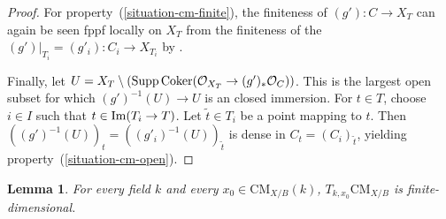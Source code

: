 \documentclass{stacks-project}
\theoremstyle{plain}
\newtheorem{lemma}[subsection]{Lemma}
\theoremstyle{definition}
\theoremstyle{remark}
\numberwithin{equation}{subsection}
\def\Im{\mathop{\rm Im}}
\def\Coker{\mathop{\rm Coker}}
\def\CMfunctor{\mathcal{C}\!{\it oh}}
\def\CMfunctor{\text{CM}}
\begin{document}
\begin{proof}
For property~(\ref{situation-cm-finite}), the finiteness of $(g') \colon C \to X_T$ can again be seen fppf locally on $X_T$ from the finiteness of the $(g')|_{T_i} = (g'_i) \colon C_i \to X_{T_i}$ by \cite[Tag 02LA]{stacks-project}.

Finally, let $U = X_T \setminus (\text{Supp}\Coker(\mathcal{O}_{X_T} \to (g')_*\mathcal{O}_C))$.
This is the largest open subset for which $(g')^{-1}(U) \to U$ is an closed immersion.
For $t \in T$, choose $i \in I$ such that $t \in \Im(T_i \to T)$.
Let $\tilde{t} \in T_i$ be a point mapping to $t$.
Then $((g')^{-1}(U))_t = ((g'_i)^{-1}(U))_{\tilde{t}}$ is dense in $C_t = (C_{i})_{\tilde{t}}$, yielding property~(\ref{situation-cm-open}).
\end{proof}

\begin{lemma}
	For every field $k$ and every $x_0\in \CMfunctor_{X/B}(k)$, $T_{k,x_0}\CMfunctor_{X/B}$ is finite-dimensional.
	\label{lemma-cm-tangent-space}
\end{lemma}
\end{document}
